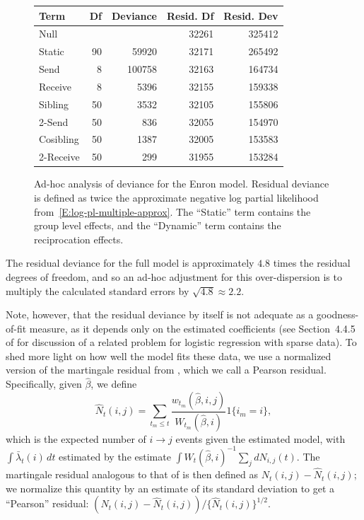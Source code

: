 \documentclass[final]{statsoc}
\begin{document}
\begin{figure}
\centering
\begin{tabular}{lrrrr}
    \toprule
    \textbf{Term}
        & \textbf{Df}
        & \textbf{Deviance}
        & \textbf{Resid. Df}
        & \textbf{Resid. Dev} \\
    \midrule
    Null &  &  & 32261 & 325412 \\
    Static & 90 & 59920 & 32171 & 265492 \\
    Send & 8 & 100758 & 32163 & 164734 \\
    Receive & 8 & 5396 & 32155 & 159338 \\
    Sibling & 50 & 3532 & 32105 & 155806 \\
    2-Send & 50 & 836 & 32055 & 154970 \\
    Cosibling & 50 & 1387 & 32005 & 153583 \\
    2-Receive & 50 & 299 & 31955 & 153284 \\
    \bottomrule
\end{tabular}
    \caption{
        Ad-hoc analysis of deviance for the Enron model.  Residual deviance
        is defined as twice the approximate negative log partial likelihood
        from~\eqref{E:log-pl-multiple-approx}.
        The ``Static'' term contains the group level effects, and the
        ``Dynamic'' term contains the reciprocation effects.
    }
    \label{F:deviance}
\end{figure}

The residual deviance for the full model is approximately $4.8$ times the
residual degrees of freedom, and so an ad-hoc adjustment for this over-dispersion
is to multiply the calculated standard errors by $\sqrt{4.8} \approx 2.2$.

Note, however, that the residual deviance by itself is not adequate as a goodness-of-fit measure,
as it depends only on the estimated coefficients (see Section~4.4.5 of
\cite{mccullagh1989generalized} for discussion of a related problem for logistic
regression with sparse data).  To shed more light on how well the model fits
these data, we use a normalized version of the martingale residual from
\cite{therneau1990martingale}, which we call a Pearson residual.
Specifically, given $\hat \beta$, we define
\[
  \hat N_{t}(i,j)
    = \sum_{t_m \leq t}
        \frac{w_{t_m}(\hat \beta, i, j)}{W_{t_m}(\hat \beta, i)}
        1\{i_m = i\},
\]
which is the expected number of $i \to j$ events given the estimated model,
with $\int \bar \lambda_t(i) \, dt$ estimated by the
\cite{breslow1974covariance} estimate $\int W_t(\hat \beta, i)^{-1} \sum_j dN_{i,j}(t)$.  The martingale residual analogous to that of \cite{therneau1990martingale} is then
defined as $N_t(i,j) - \hat N_t(i,j)$; we normalize this quantity by an
estimate of its standard deviation to get a ``Pearson'' residual:
\(
    {(N_t(i,j) - \hat N_t(i,j))}/\{\hat N_t(i,j)\}^{1/2}.
\)
\end{document}
